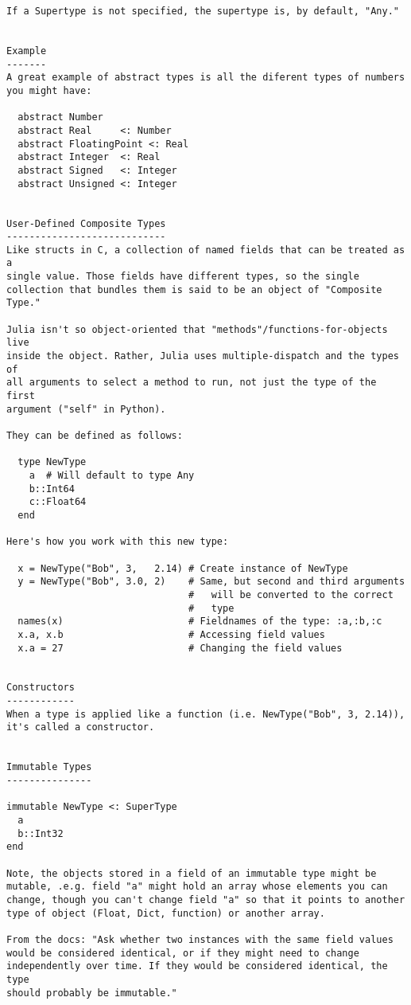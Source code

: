 \documentclass[12pt]{article}
\theoremstyle{plain}
\theoremstyle{definition}
\theoremstyle{remark}
\begin{document}
\begin{lstlisting}
If a Supertype is not specified, the supertype is, by default, "Any."


Example
-------
A great example of abstract types is all the diferent types of numbers
you might have:

  abstract Number
  abstract Real     <: Number
  abstract FloatingPoint <: Real
  abstract Integer  <: Real
  abstract Signed   <: Integer
  abstract Unsigned <: Integer


User-Defined Composite Types
----------------------------
Like structs in C, a collection of named fields that can be treated as a
single value. Those fields have different types, so the single
collection that bundles them is said to be an object of "Composite
Type."

Julia isn't so object-oriented that "methods"/functions-for-objects live
inside the object. Rather, Julia uses multiple-dispatch and the types of
all arguments to select a method to run, not just the type of the first
argument ("self" in Python).

They can be defined as follows:

  type NewType
    a  # Will default to type Any
    b::Int64
    c::Float64
  end

Here's how you work with this new type:

  x = NewType("Bob", 3,   2.14) # Create instance of NewType
  y = NewType("Bob", 3.0, 2)    # Same, but second and third arguments
                                #   will be converted to the correct
                                #   type
  names(x)                      # Fieldnames of the type: :a,:b,:c
  x.a, x.b                      # Accessing field values
  x.a = 27                      # Changing the field values


Constructors
------------
When a type is applied like a function (i.e. NewType("Bob", 3, 2.14)),
it's called a constructor.


Immutable Types
---------------

immutable NewType <: SuperType
  a
  b::Int32
end

Note, the objects stored in a field of an immutable type might be
mutable, .e.g. field "a" might hold an array whose elements you can
change, though you can't change field "a" so that it points to another
type of object (Float, Dict, function) or another array.

From the docs: "Ask whether two instances with the same field values
would be considered identical, or if they might need to change
independently over time. If they would be considered identical, the type
should probably be immutable."


\end{lstlisting}
\end{document}
